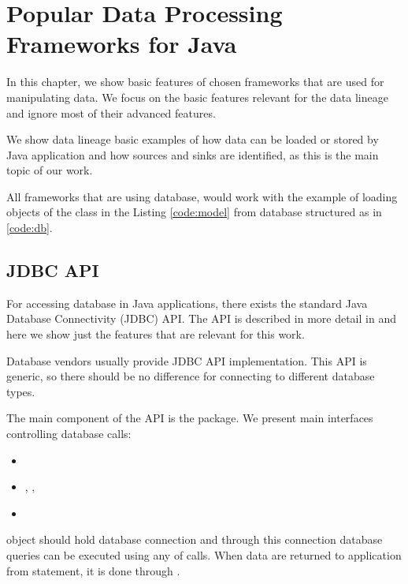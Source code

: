 
\chapter{Popular Data Processing Frameworks for Java \label{chapter:frameworks}}

In this chapter, we show basic features of chosen frameworks
that are used for manipulating data.
We focus on the basic features relevant for the data lineage
and ignore most of their advanced features.

We show data lineage basic examples of how data can be loaded or stored by Java application
and how sources and sinks are identified, as this is the main topic of our work.

All frameworks that are using database, would work with the example
of loading objects of the class  in the Listing \ref{code:model}
from database structured as in \ref{code:db}.







\section{JDBC API \label{frameworks:jdbc}}

For accessing database in Java applications, there exists the standard
Java Database Connectivity (JDBC) API.
The API is described in more detail in \citet{JDBC_OVERVIEW}
and here we show just the features that are relevant for this work.

Database vendors usually provide JDBC API implementation. This API is generic, so
there should be no difference for connecting to different database types.

The main component of the API is the  \citep{java.sql} package.
We present main interfaces controlling database calls:
\begin{itemize}
  \item {}
  \item {}, , 
  \item {}
\end{itemize}

 object should hold database connection and through this connection
database queries can be executed using any of  calls.
When data are returned to application from statement, it is done through .

